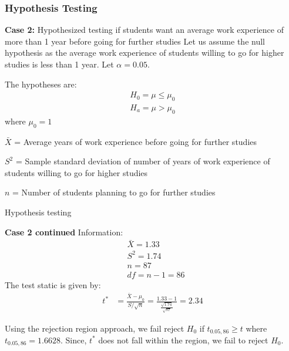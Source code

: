 \documentclass{beamer}
\begin{document}
\begin{frame}
  \frametitle{Hypothesis Testing}
  \begin{block}{\textbf{Case 2:}{ Hypothesized testing if students want an average work experience of more than 1 year before going for further studies }}
     Let us assume the null hypothesis as the average work experience of students willing to go for higher studies is  less than 1 year. Let $\alpha = 0.05$.

     The hypotheses are:
      \begin{align*}
          H_0=\mu\leq \mu_0\\
          H_a=\mu > \mu_0
      \end{align*}
      where $\mu_0 = 1$

     \begin{enumerate*}
         \item  $\bar{X}$ = Average years of work experience before going for further studies\\
         \item  $S^2$ = Sample standard deviation of number of years of work experience of students willing to go for higher studies\\
         \item $n$ = Number of students planning to go for further studies\\
     \end{enumerate*}
        \end{block}
    \end{frame}

    \begin{frame}{Hypothesis testing}
        \begin{block}{\textbf{Case 2 continued}}
            Information:
             \begin{align}
                 &\bar{X}= 1.33\\
                 &S^2 = 1.74\\
                 &n=87\\
                 &df = n-1 = 86
             \end{align}
             The test static is given by:
             \begin{align}
                 t^* &= \frac{\bar{X} - \mu_0}{ S/ \sqrt{n}}
                 = \frac{1.33 - 1}{\frac{\sqrt{1.74}}{\sqrt{87}}}
                 = 2.34
             \end{align}

             Using the rejection region approach, we fail reject $H_0$ if $t_{0.05,86}\geq t$ where $t_{0.05,86} = 1.6628$. Since, $t^*$ does not fall within the region, we fail to reject $H_0$.
        \end{block}
    \end{frame}
\end{document}
